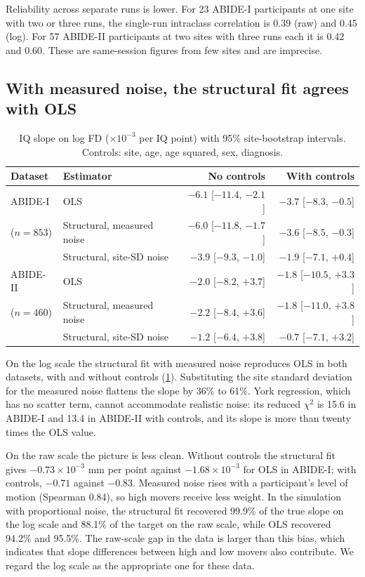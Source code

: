\documentclass[11pt,a4paper]{article}
\begin{document}
Reliability across separate runs is lower. For 23 ABIDE-I participants at one site with two or three runs, the single-run intraclass correlation is 0.39 (raw) and 0.45 (log). For 57 ABIDE-II participants at two sites with three runs each it is 0.42 and 0.60. These are same-session figures from few sites and are imprecise.

\subsection{With measured noise, the structural fit agrees with OLS}

\begin{table}[H]
\centering
\caption{IQ slope on log FD ($\times 10^{-3}$ per IQ point) with 95\% site-bootstrap intervals. Controls: site, age, age squared, sex, diagnosis.}
\label{tab:measured}
\begin{tabular}{llrr}
\toprule
Dataset & Estimator & No controls & With controls \\
\midrule
ABIDE-I & OLS & $-6.1$ [$-11.4$, $-2.1$] & $-3.7$ [$-8.3$, $-0.5$] \\
($n = 853$) & Structural, measured noise & $-6.0$ [$-11.8$, $-1.7$] & $-3.6$ [$-8.5$, $-0.3$] \\
 & Structural, site-SD noise & $-3.9$ [$-9.3$, $-1.0$] & $-1.9$ [$-7.1$, $+0.4$] \\
ABIDE-II & OLS & $-2.0$ [$-8.2$, $+3.7$] & $-1.8$ [$-10.5$, $+3.3$] \\
($n = 460$) & Structural, measured noise & $-2.2$ [$-8.4$, $+3.6$] & $-1.8$ [$-11.0$, $+3.8$] \\
 & Structural, site-SD noise & $-1.2$ [$-6.4$, $+3.8$] & $-0.7$ [$-7.1$, $+3.2$] \\
\bottomrule
\end{tabular}
\end{table}

On the log scale the structural fit with measured noise reproduces OLS in both datasets, with and without controls (\cref{tab:measured}). Substituting the site standard deviation for the measured noise flattens the slope by 36\% to 61\%. York regression, which has no scatter term, cannot accommodate realistic noise: its reduced $\chi^2$ is 15.6 in ABIDE-I and 13.4 in ABIDE-II with controls, and its slope is more than twenty times the OLS value.

On the raw scale the picture is less clean. Without controls the structural fit gives $-0.73 \times 10^{-3}$ mm per point against $-1.68 \times 10^{-3}$ for OLS in ABIDE-I; with controls, $-0.71$ against $-0.83$. Measured noise rises with a participant's level of motion (Spearman 0.84), so high movers receive less weight. In the simulation with proportional noise, the structural fit recovered 99.9\% of the true slope on the log scale and 88.1\% of the target on the raw scale, while OLS recovered 94.2\% and 95.5\%. The raw-scale gap in the data is larger than this bias, which indicates that slope differences between high and low movers also contribute. We regard the log scale as the appropriate one for these data.
\end{document}
